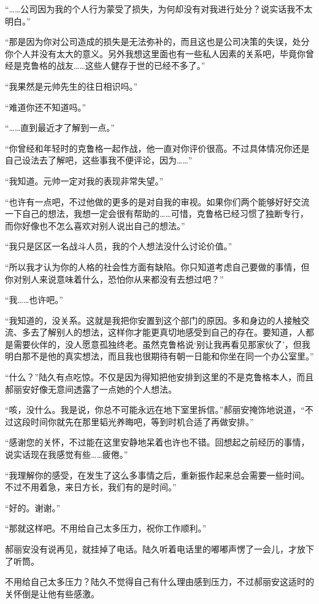 “……公司因为我的个人行为蒙受了损失，为何却没有对我进行处分？说实话我不太明白。”

“那是因为你对公司造成的损失是无法弥补的，而且这也是公司决策的失误，处分你个人并没有太大的意义。另外我想这里面也有一些私人因素的关系吧，毕竟你曾经是克鲁格的战友……这些人健存于世的已经不多了。”

“我果然是元帅先生的往日相识吗。”

“难道你还不知道吗。”

“……直到最近才了解到一点。”

“你曾经和年轻时的克鲁格一起作战，他一直对你评价很高。不过具体情况你还是自己设法去了解吧，这些事我不便评论，因为……”

“我知道。元帅一定对我的表现非常失望。”

“也许有一点吧，不过他做的更多的是对自我的审视。如果你们两个能够好好交流一下自己的想法，我想一定会很有帮助的……可惜，克鲁格已经习惯了独断专行，而你好像也不怎么喜欢对别人说出自己的想法。”

“我只是区区一名战斗人员，我的个人想法没什么讨论价值。”

“所以我才认为你的人格的社会性方面有缺陷。你只知道考虑自己要做的事情，但你对别人来说意味着什么，恐怕你从来都没有去想过吧？”

“我……也许吧。”

“我知道的，没关系。这就是我把你安置到这个部门的原因。多和身边的人接触交流、多去了解别人的想法，这样你才能更真切地感受到自己的存在。要知道，人都是需要伙伴的，没人愿意孤独终老。虽然克鲁格说‘别让我再看见那家伙了’，但我明白那不是他的真实想法，而且我也很期待有朝一日能和你坐在同一个办公室里。”

“什么？”陆久有点吃惊。不仅是因为得知把他安排到这里的不是克鲁格本人，而且郝丽安好像无意间透露了一点她的个人想法。

“咳，没什么。我是说，你总不可能永远在地下室里拆信。”郝丽安掩饰地说道，“不过这段时间你就先在那里韬光养晦吧，等到时机合适了再做安排。”

“感谢您的关怀，不过能在这里安静地呆着也许也不错。回想起之前经历的事情，说实话现在我感觉有些……疲倦。”

“我理解你的感受，在发生了这么多事情之后，重新振作起来总会需要一些时间。不过不用着急，来日方长，我们有的是时间。”

“好的。谢谢。”

“那就这样吧。不用给自己太多压力，祝你工作顺利。”

郝丽安没有说再见，就挂掉了电话。陆久听着电话里的嘟嘟声愣了一会儿，才放下了听筒。

不用给自己太多压力？陆久不觉得自己有什么理由感到压力，不过郝丽安这适时的关怀倒是让他有些感激。

